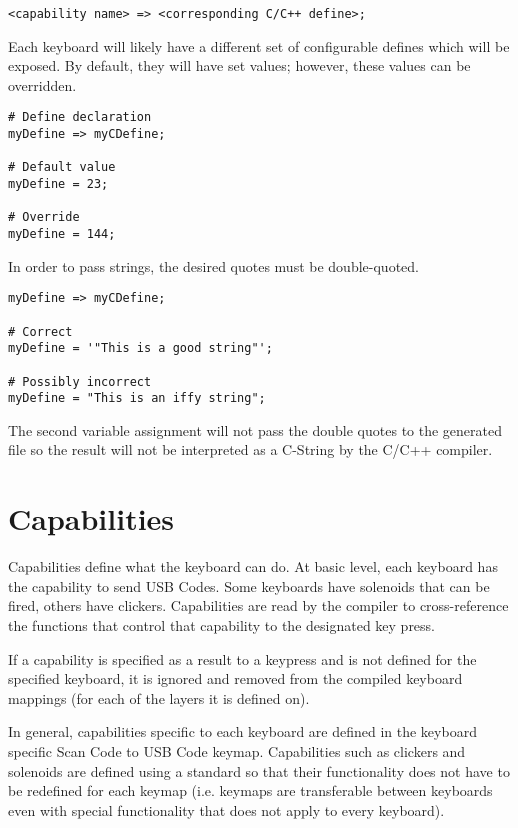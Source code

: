 \documentclass{kiibohd-template}
\begin{document}
\begin{lstlisting}
<capability name> => <corresponding C/C++ define>;
\end{lstlisting}

Each keyboard will likely have a different set of configurable defines which will be exposed.
By default, they will have set values; however, these values can be overridden.

\begin{lstlisting}
# Define declaration
myDefine => myCDefine;

# Default value
myDefine = 23;

# Override
myDefine = 144;
\end{lstlisting}

In order to pass strings, the desired quotes must be double-quoted.

\begin{lstlisting}
myDefine => myCDefine;

# Correct
myDefine = '"This is a good string"';

# Possibly incorrect
myDefine = "This is an iffy string";
\end{lstlisting}

The second variable assignment will not pass the double quotes to the generated file so the result will not be interpreted as a C-String by the C/C++ compiler.


\chapter{Capabilities}
\label{chpt:Capabilities}

Capabilities define what the keyboard can do.
At basic level, each keyboard has the capability to send USB Codes.
Some keyboards have solenoids that can be fired, others have clickers.
Capabilities are read by the compiler to cross-reference the functions that control that capability to the designated key press.

If a capability is specified as a result to a keypress and is not defined for the specified keyboard, it is ignored and removed from the compiled keyboard mappings (for each of the layers it is defined on).

In general, capabilities specific to each keyboard are defined in the keyboard specific Scan Code to USB Code keymap.
Capabilities such as clickers and solenoids are defined using a standard so that their functionality does not have to be redefined for each keymap (i.e. keymaps are transferable between keyboards even with special functionality that does not apply to every keyboard).
\end{document}

